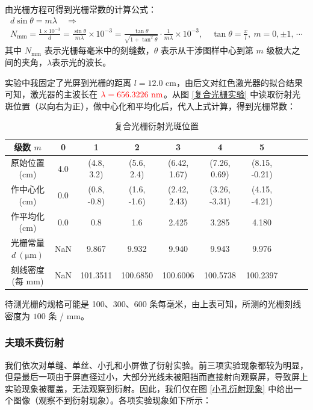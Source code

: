 \documentclass[UTF8]{article}
\theoremstyle{MyLineTheoremStyle} %
\theoremstyle{MyBlockTheoremStyle} %
\theoremstyle{MySubsubsectionStyle} %
\begin{document}
由光栅方程可得到光栅常数的计算公式：
\begin{gather}
    d\sin{\theta} = m\lambda \quad \Longrightarrow \\ 
    N_{\text{mm}} = \frac{1 \times 10^{-3}}{d} = \frac{\sin \theta}{m\lambda} \times 10^{-3} = \frac{\tan \theta}{\sqrt{1 + \tan^2 \theta}}\cdot \frac{1}{m\lambda}\times 10^{-3},\quad \tan \theta = \frac{x}{l}
    ,\ m=0,\pm 1, \,\cdots
\end{gather}
其中 $N_\text{mm}$ 表示光栅每毫米中的刻缝数，$\theta$ 表示从干涉图样中心到第 $m$ 级极大之间的夹角，$\lambda$表示光的波长。

实验中我固定了光屏到光栅的距离 $l=12.0$ cm，由后文对红色激光器的拟合结果可知，激光器的主波长在 ${\color{red} \lambda = 656.3226\ \mathrm{nm}}$。从图 \ref{复合光栅实验} 中读取衍射光斑位置（以向右为正），做中心化和平均化后，代入上式计算，得到光栅常数：
\begin{table}[H]\centering
    \caption{复合光栅衍射光斑位置}
    \label{复合光栅衍射光斑位置}
\begin{tabular}{cccccccccc}\toprule
    级数 $m$ & 0 & 1 & 2 & 3 & 4 & 5 \\
    \midrule
    原始位置 (cm) & 4.0 & (4.8, 3.2)  & (5.6, 2.4)  & (6.42, 1.67) & (7.26, 0.69) & (8.15, -0.21)  \\
    作中心化 (cm) & 0.0 & (0.8, -0.8) & (1.6, -1.6) & (2.42, 2.43) & (3.26, -3.31) & (4.15, -4.21)  \\
    作平均化 (cm) & 0.0 & 0.8 & 1.6 & 2.425 & 3.285 & 4.180  \\
    光栅常量 $d \ \mathrm{(\mu m)}$ & NaN & 9.867 & 9.932 & 9.940 & 9.943 & 9.976  \\
    刻线密度 (每 mm) & NaN & 101.3511 & 100.6850 & 100.6006 & 100.5738 & 100.2397  \\
    \bottomrule
\end{tabular}
\end{table}
待测光栅的规格可能是 100、300、600 条每毫米，由上表可知，所测的光栅刻线密度为 $100$ 条 / mm。

\subsubsection{夫琅禾费衍射}
我们依次对单缝、单丝、小孔和小屏做了衍射实验。前三项实验现象都较为明显，但是最后一项由于屏直径过小，大部分光线未被阻挡而直接射向观察屏，导致屏上实验现象被覆盖，无法观察到衍射。因此，我们仅在图 \ref{小孔衍射现象} 中给出一个图像（观察不到衍射现象）。各项实验现象如下所示：
\end{document}
